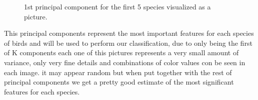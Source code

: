 \documentclass[11pt]{article}
\begin{document}
\begin{singlespace}
\begin{enumerate}
\begin{figure}[h]
    
    \caption{1st principal component for the first 5 species visualized as a picture.}
\end{figure} 

This principal components represent the most important features for each species of birds and will be used to perform our classification, due to only being the first of K components each one of this pictures represents a very small amount of variance, only very fine details and combinations of color values con be seen in each image. it may appear random but when put together with the rest of principal components we get a pretty good estimate of the most significant features for each species.


\end{enumerate}
\end{singlespace}
\end{document}

